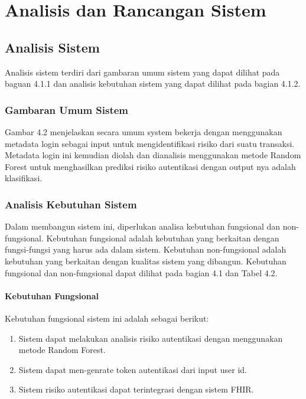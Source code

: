 \chapter{Analisis dan Rancangan Sistem}

\section{Analisis Sistem}

Analisis sistem terdiri dari gambaran umum sistem yang dapat dilihat pada baguan 4.1.1 dan analisis kebutuhan sistem yang dapat dilihat pada bagian 4.1.2.

\subsection{Gambaran Umum Sistem}

Gambar 4.2 menjelaskan secara umum system bekerja dengan menggunakan metadata login sebagai input untuk mengidentifikasi risiko dari suatu transaksi. Metadata login ini kemudian diolah dan dianalisis menggunakan metode Random Forest untuk menghasilkan prediksi risiko autentikasi dengan output nya adalah klasifikasi.

\subsection{Analisis Kebutuhan Sistem}
Dalam membangun sistem ini, diperlukan analisa kebutuhan fungsional dan non-fungsional. Kebutuhan fungsional adalah kebutuhan yang berkaitan dengan fungsi-fungsi yang harus ada dalam sistem. Kebutuhan non-fungsional adalah kebutuhan yang berkaitan dengan kualitas sistem yang dibangun. Kebutuhan fungsional dan non-fungsional dapat dilihat pada bagian 4.1 dan Tabel 4.2.

\subsubsection{Kebutuhan Fungsional}
Kebutuhan fungsional sistem ini adalah sebagai berikut:
\begin{enumerate}
    \item Sistem dapat melakukan analisis risiko autentikasi dengan menggunakan metode Random Forest.
    \item Sistem dapat men-genrate token autentikasi dari input user id.
    \item Sistem risiko autentikasi dapat terintegrasi dengan sistem FHIR.
\end{enumerate}

